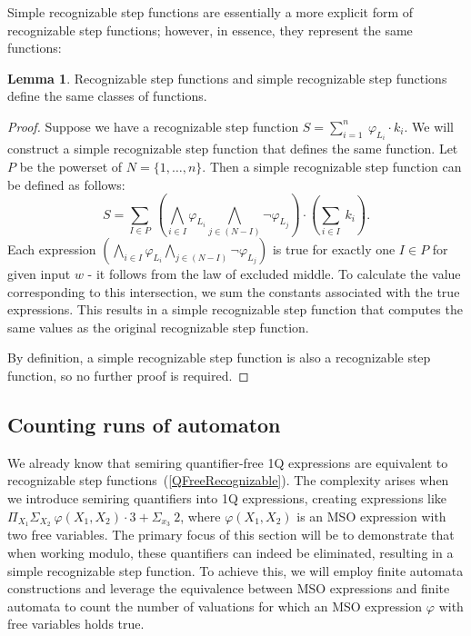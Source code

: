 \documentclass[12pt]{article}
\theoremstyle{definition}
\newtheorem{lemma}[theorem]{Lemma}
\begin{document}
Simple recognizable step functions are essentially a more explicit form of recognizable step functions; however, in essence, they represent the same functions:

\begin{lemma}
    \label{RecEqSimpleRec}
    Recognizable step functions and simple recognizable step functions define the same classes of functions.
\end{lemma}

\begin{proof}
    Suppose we have a recognizable step function $S = \sum_{i = 1}^{n} \ \varphi_{L_i} \cdot k_i$. We will construct a simple recognizable step function that defines the same function. Let $P$ be the powerset of $N = \{1,\ldots,n\}$. Then a simple recognizable step function can be defined as follows:
    $$S = \sum_{I \in P} \ (\bigwedge_{i \in I} \varphi_{L_i} \bigwedge_{j \in (N-I)} \neg \varphi_{L_j}) \cdot (\sum_{i \in I} \ k_i).$$
    Each expression $(\bigwedge_{i \in I} \varphi_{L_i} \bigwedge_{j \in (N-I)} \neg \varphi_{L_j})$ is true for exactly one $I \in P$ for given input $w$ - it follows from the law of excluded middle. To calculate the value corresponding to this intersection, we sum the constants associated with the true expressions. This results in a simple recognizable step function that computes the same values as the original recognizable step function.

    By definition, a simple recognizable step function is also a recognizable step function, so no further proof is required.
\end{proof}

\subsection{Counting runs of automaton}

We already know that semiring quantifier-free 1Q expressions are equivalent to recognizable step functions~(\cref{QFreeRecognizable}). The complexity arises when we introduce semiring quantifiers into 1Q expressions, creating expressions like $\Pi_{X_1} \Sigma_{X_2} \ \varphi(X_1, X_2) \cdot 3 + \Sigma_{x_3} \ 2$, where $\varphi(X_1, X_2)$ is an MSO expression with two free variables. The primary focus of this section will be to demonstrate that when working modulo, these quantifiers can indeed be eliminated, resulting in a simple recognizable step function. To achieve this, we will employ finite automata constructions and leverage the equivalence between MSO expressions and finite automata to count the number of valuations for which an MSO expression $\varphi$ with free variables holds true.
\end{document}
